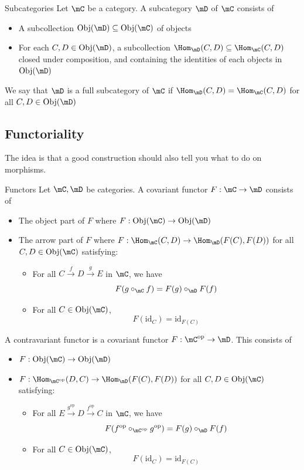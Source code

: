 \documentclass[a4paper]{article}
\begin{document}
\begin{defn}{Subcategories}{} Let $\mC$ be a category. A subcategory $\mD$ of $\mC$ consists of 
\begin{itemize}
\item A subcollection $\text{Obj}(\mD)\subseteq\text{Obj}(\mC)$ of objects
\item For each $C,D\in\text{Obj}(\mD)$, a subcollection $\Hom_\mD(C,D)\subseteq\Hom_\mC(C,D)$ closed under composition, and containing the identities of each objects in $\text{Obj}(\mD)$
\end{itemize}
We say that $\mD$ is a full subcategory of $\mC$ if $\Hom_\mD(C,D)=\Hom_\mC(C,D)$ for all $C,D\in\text{Obj}(\mD)$
\end{defn}

\subsection{Functoriality}
The idea is that a good construction should also tell you what to do on morphisms. 

\begin{defn}{Functors}{} Let $\mC,\mD$ be categories. A covariant functor $F:\mC\to\mD$ consists of 
\begin{itemize}
\item The object part of $F$ where $F:\text{Obj}(\mC)\to\text{Obj}(\mD)$
\item The arrow part of $F$ where $F:\Hom_\mC(C,D)\to\Hom_\mD(F(C),F(D))$ for all $C,D\in\text{Obj}(\mC)$ satisfying:
\begin{itemize}
\item For all $C\overset{f}{\rightarrow}D\overset{g}{\rightarrow}E$ in $\mC$, we have $$F(g\circ_\mC f)=F(g)\circ_\mD F(f)$$
\item For all $C\in\text{Obj}(\mC)$, $$F(\text{id}_C)=\text{id}_{F(C)}$$
\end{itemize}
\end{itemize}
A contravariant functor is a covariant functor $F:\mC^\text{op}\to\mD$. This consists of 
\begin{itemize}
\item $F:\text{Obj}(\mC)\to\text{Obj}(\mD)$
\item $F:\Hom_{\mC^{\text{op}}}(D,C)\to\Hom_\mD(F(C),F(D))$ for all $C,D\in\text{Obj}(\mC)$ satisfying:
\begin{itemize}
\item For all $E\overset{g^{\text{op}}}{\rightarrow}D\overset{f^{\text{op}}}{\rightarrow}C$ in $\mC$, we have $$F(f^{\text{op}}\circ_{\mC^{\text{op}}}g^{\text{op}})=F(g)\circ_\mD F(f)$$
\item For all $C\in\text{Obj}(\mC)$, $$F(\text{id}_C)=\text{id}_{F(C)}$$
\end{itemize}
\end{itemize}
\end{defn}
\end{document}
